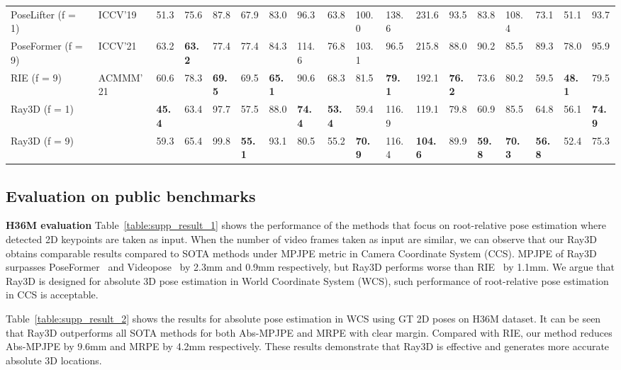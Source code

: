 \documentclass[10pt,twocolumn,letterpaper]{article}
\begin{document}
\begin{table*}[htbp]
\begin{tabular}{@{}l|llllllllllllllll|l@{}}
PoseLifter (f = 1)~\cite{ju2019absposelifter}           &ICCV'19  &51.3  &75.6  &87.8  &67.9   &83.0  & 96.3  & 63.8 & 100.0    & 138.6  & 231.6 & 93.5  & 83.8  & 108.4  & 73.1 & 51.1   & 93.7    \\
PoseFormer (f = 9)~\cite{ce2021poseformer}       &ICCV'21  &63.2  &\textbf{63.2}  &77.4  &77.4   &84.3  &114.6  & 76.8 & 103.1    & 96.5   & 215.8 & 88.0  & 90.2  & 85.5   & 89.3 & 78.0   & 95.9    \\
RIE (f = 9)~\cite{wenkang2021improving}         &ACMMM'21 &60.6  &78.3  &\textbf{69.5}  &69.5   &\textbf{65.1}  & 90.6  & 68.3 & 81.5     & \textbf{79.1}   & 192.1 & \textbf{76.2}  & 73.6  & 80.2   & 59.5 & \textbf{48.1}   & 79.5    \\ \hline
Ray3D (f = 1)                                    &         &\textbf{45.4}  &63.4  &97.7  &57.5   &88.0  & \textbf{74.4}  & \textbf{53.4} & 59.4     & 116.9  & 119.1 & 79.8  & 60.9  & 85.5   & 64.8 & 56.1   & \textbf{74.9}    \\ 
Ray3D (f = 9)                                    &         &59.3  &65.4  &99.8  &\textbf{55.1}   &93.1  & 80.5  & 55.2 & \textbf{70.9}     & 116.4  & \textbf{104.6} & 89.9  & \textbf{59.8}  & \textbf{70.3}   & \textbf{56.8} & 52.4   & 75.3    \\ \bottomrule
\end{tabular}
\label{table:supp_result_2}
\end{table*}

\subsection{Evaluation on public benchmarks}
\noindent\textbf{H36M evaluation}
Table~\ref{table:supp_result_1} shows the performance of the methods that focus on root-relative pose estimation where detected 2D keypoints are taken as input. When the number of video frames taken as input are similar, we can observe that our Ray3D obtains comparable results compared to SOTA methods under MPJPE metric in Camera Coordinate System (CCS). MPJPE of Ray3D surpasses PoseFormer~\cite{ce2021poseformer} and Videopose~\cite{dario2019videopose} by 2.3mm and 0.9mm respectively, but Ray3D performs worse than RIE~\cite{wenkang2021improving} by 1.1mm. We argue that Ray3D is designed for absolute 3D pose estimation in World Coordinate System (WCS), such performance of root-relative pose estimation in CCS is acceptable.

Table~\ref{table:supp_result_2} shows the results for absolute pose estimation in WCS using GT 2D poses on H36M dataset. It can be seen that Ray3D outperforms all SOTA methods for both Abs-MPJPE and MRPE with clear margin. Compared with RIE, our method reduces Abs-MPJPE by 9.6mm and MRPE by 4.2mm respectively. These results demonstrate that Ray3D is effective and generates more accurate absolute 3D locations. 
\end{document}
